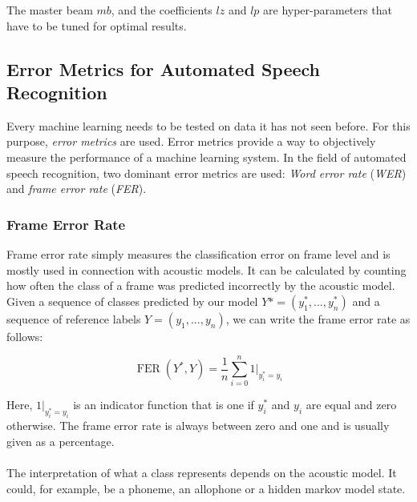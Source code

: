 The master beam $mb$, and the coefficients $lz$ and $lp$ are hyper-parameters that have to be tuned for optimal results. 

\subsection{Error Metrics for Automated Speech Recognition}
Every machine learning needs to be tested on data it has not seen before. For this purpose, \textit{error metrics} are used. Error metrics provide a way to objectively measure the performance of a machine learning system. In the field of automated speech recognition, two dominant error metrics are used: \textit{Word error rate} (\textit{WER}) and \textit{frame error rate} (\textit{FER}).

\subsubsection{Frame Error Rate}
Frame error rate simply measures the classification error on frame level and is mostly used in connection with acoustic models. It can be calculated by counting how often the class of a frame was predicted incorrectly by the acoustic model. Given a sequence of classes predicted by our model $Y* = (y^*_1, ..., y^*_n)$ and a sequence of reference labels $Y = (y_1, ..., y_n)$, we can write the frame error rate as follows:

\[
\operatorname{FER}(Y^*, Y) = \frac{1}{n} \sum_{i = 0}^n 1|_{y^*_i = y_i} 
\]

Here, $1|_{y^*_i = y_i}$ is an indicator function that is one if $y^*_i$ and $y_i$ are equal and zero otherwise. The frame error rate is always between zero and one and is usually given as a percentage. 
\\ \\ 
The interpretation of what a class represents depends on the acoustic model. It could, for example, be a phoneme, an allophone or a hidden markov model state. 

